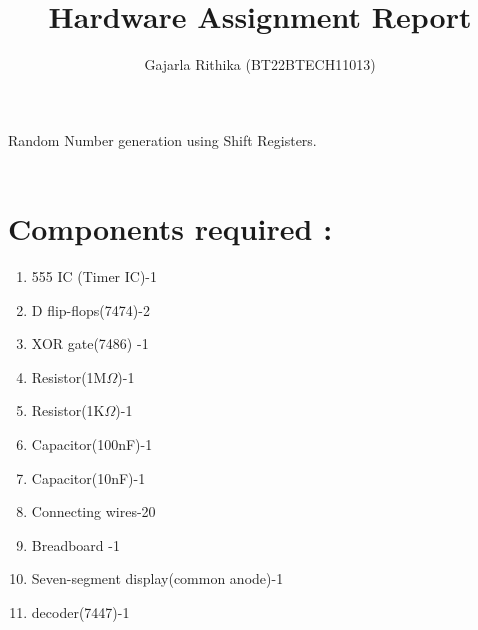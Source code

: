 \documentclass[12pt,onecolumn,notitlepage]{article}
\title{Hardware Assignment Report}
\author{Gajarla Rithika (BT22BTECH11013)}
\date{}
\begin{document}
\maketitle

Random Number generation using Shift Registers.\\\\

   \section*{Components required :}
\begin{enumerate}

  \setlength\itemsep{0pt} %
  \item     555 IC (Timer IC)-1
\item D flip-flops(7474)-2
\item XOR gate(7486) -1
\item Resistor(1M$\Omega$)-1
\item Resistor(1K$\Omega$)-1
\item Capacitor(100nF)-1
\item Capacitor(10nF)-1
\item Connecting wires-20
\item Breadboard -1
\item Seven-segment display(common anode)-1
\item decoder(7447)-1

\end{enumerate} 
\end{document}
